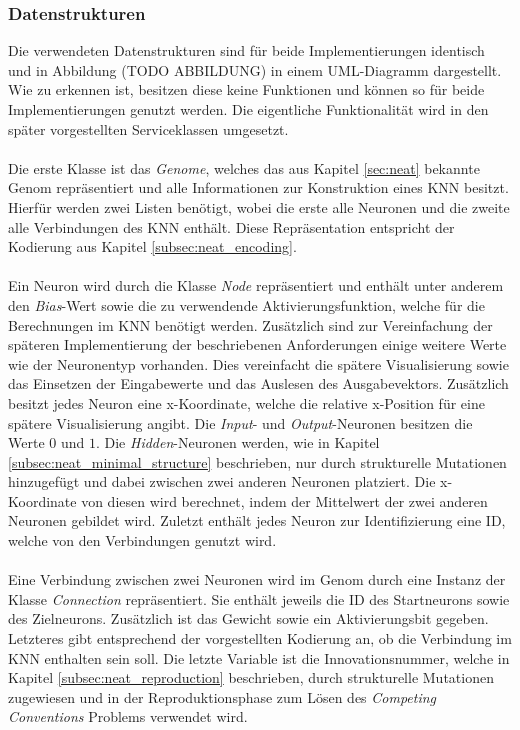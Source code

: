 \subsubsection{Datenstrukturen}
\label{subsubsec:data_structures}
Die verwendeten Datenstrukturen sind für beide Implementierungen identisch und in Abbildung (TODO ABBILDUNG) in einem UML-Diagramm dargestellt. Wie zu erkennen ist, besitzen diese keine Funktionen und können so für beide Implementierungen genutzt werden. Die eigentliche Funktionalität wird in den später vorgestellten Serviceklassen umgesetzt.
\\\\
Die erste Klasse ist das \emph{Genome}, welches das aus Kapitel \ref{sec:neat} bekannte Genom repräsentiert und alle Informationen zur Konstruktion eines \ac{KNN} besitzt. Hierfür werden zwei Listen benötigt, wobei die erste alle Neuronen und die zweite alle Verbindungen des \ac{KNN} enthält. Diese Repräsentation entspricht der Kodierung aus Kapitel \ref{subsec:neat_encoding}. 
\\\\
Ein Neuron wird durch die Klasse \emph{Node} repräsentiert und enthält unter anderem den \emph{Bias}-Wert sowie die zu verwendende Aktivierungsfunktion, welche für die Berechnungen im \ac{KNN} benötigt werden. Zusätzlich sind zur Vereinfachung der späteren Implementierung der beschriebenen Anforderungen einige weitere Werte wie der Neuronentyp vorhanden. Dies vereinfacht die spätere Visualisierung sowie das Einsetzen der Eingabewerte und das Auslesen des Ausgabevektors. Zusätzlich besitzt jedes Neuron eine x-Koordinate, welche die relative x-Position für eine spätere Visualisierung angibt. Die \emph{Input}- und \emph{Output}-Neuronen besitzen die Werte $0$ und $1$. Die \emph{Hidden}-Neuronen werden, wie in Kapitel \ref{subsec:neat_minimal_structure} beschrieben, nur durch strukturelle Mutationen hinzugefügt und dabei zwischen zwei anderen Neuronen platziert. Die x-Koordinate von diesen wird berechnet, indem der Mittelwert der zwei anderen Neuronen gebildet wird. Zuletzt enthält jedes Neuron zur Identifizierung eine ID, welche von den Verbindungen genutzt wird.
\\\\
Eine Verbindung zwischen zwei Neuronen wird im Genom durch eine Instanz der Klasse \emph{Connection} repräsentiert. Sie enthält jeweils die ID des Startneurons sowie des Zielneurons. Zusätzlich ist das Gewicht sowie ein Aktivierungsbit gegeben. Letzteres gibt entsprechend der vorgestellten Kodierung an, ob die Verbindung im \ac{KNN} enthalten sein soll. Die letzte Variable ist die Innovationsnummer, welche in Kapitel \ref{subsec:neat_reproduction} beschrieben, durch strukturelle Mutationen zugewiesen und in der Reproduktionsphase zum Lösen des \emph{Competing Conventions} Problems verwendet wird.
